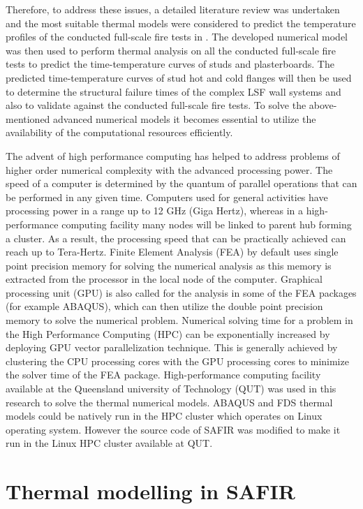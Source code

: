 Therefore, to address these issues, a detailed literature review was undertaken and the most suitable thermal models were considered to predict the temperature profiles of the conducted full-scale fire tests in . The developed numerical model was then used to perform thermal analysis on all the conducted full-scale fire tests to predict the time-temperature curves of studs and plasterboards. The predicted time-temperature curves of stud hot and cold flanges will then be used to determine the structural failure times of the complex LSF wall systems and also to validate against the conducted full-scale fire tests. To solve the above-mentioned advanced numerical models it becomes essential to utilize the availability of the computational resources efficiently. 

The advent of high performance computing has helped to address problems of higher order numerical complexity with the advanced processing power. The speed of a computer is determined by the quantum of parallel operations that can be performed in any given time. Computers used for general activities have processing power in a range up to 12 GHz (Giga Hertz), whereas in a high-performance computing facility many nodes will be linked to parent hub forming a cluster. As a result, the processing speed that can be practically achieved can reach up to Tera-Hertz. Finite Element Analysis (FEA) by default uses single point precision memory for solving the numerical analysis as this memory is extracted from the processor in the local node of the computer. Graphical processing unit (GPU) is also called for the analysis in some of the FEA packages (for example ABAQUS), which can then utilize the double point precision memory to solve the numerical problem. Numerical solving time for a problem in the High Performance Computing (HPC) can be exponentially increased by deploying GPU vector parallelization technique. This is generally achieved by clustering the CPU processing cores with the GPU processing cores to minimize the solver time of the FEA package. High-performance computing facility available at the Queensland university of Technology (QUT) was used in this research to solve the thermal numerical models. ABAQUS and FDS thermal models could be natively run in the HPC cluster which operates on Linux operating system. However the source code of SAFIR was modified to make it run in the Linux HPC cluster available at QUT.

\section{Thermal modelling in SAFIR}


